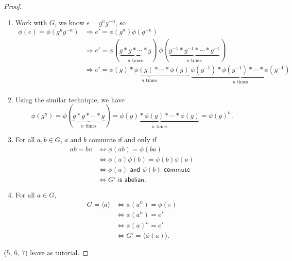 \begin{proof}
    \begin{enumerate}
        \item Work with $G$, we know $e = g^n g^{-n}$, so 
        \begin{align*}
            \phi(e) = \phi(g^ng^{-n})&\Rightarrow e' = \phi(g^n) \phi(g^{-n})\\
            &\Rightarrow e' = \phi(\underbrace{g * g * \cdots * g}_{n \text{ times}})\> \phi(\underbrace{g^{-1} * g^{-1} * \cdots * g^{-1}}_{n \text{ times}})\\
            &\Rightarrow e' = \underbrace{\phi(g) * \phi(g) * \cdots * \phi(g)}_{n \text{ times}}\> \underbrace{\phi(g^{-1}) * \phi(g^{-1}) * \cdots * \phi(g^{-1})}_{n \text{ times}}\\
        \end{align*}

        \item Using the similar technique, we have 
            \[
                \phi(g^n) = \phi(\underbrace{g * g * \cdots * g}_{n \text{ times}}) = \underbrace{\phi(g) * \phi(g) * \cdots * \phi(g)}_{n \text{ times}} = \phi(g)^n.
            \]
        
        \item For all $a,b \in G$, $a$ and $b$ commute if and only if 
            \begin{align*}
                ab = ba &\Longleftrightarrow \phi(ab) = \phi(ba) \\
                &\Longleftrightarrow \phi(a) \phi(b) = \phi(b) \phi(a) \\
                &\Longleftrightarrow \phi(a) \textsf{ and } \phi(b) \textsf{ commute}\\
                &\Longleftrightarrow G' \textsf{ is abelian}.
            \end{align*}
        
        \item For all $a \in G$, 
            \begin{align*}
                G = \langle a \rangle &\Longleftrightarrow \phi(a^n) = \phi(e) \\
                &\Longleftrightarrow \phi(a^n) = e' \\
                &\Longleftrightarrow \phi(a)^n = e'\\
                &\Longleftrightarrow G' = \langle \phi(a) \rangle.
            \end{align*}
    \end{enumerate}

    (5, 6, 7) leave as tutorial.
\end{proof}

